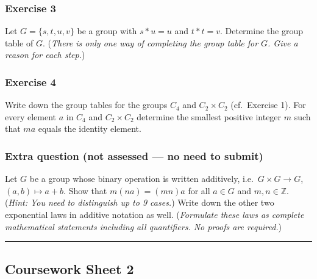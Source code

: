 \documentclass[
  12pt,
  a4paper,
  twoside]{article}
\theoremstyle{plain}
\theoremstyle{definition}
\begin{document}
\hypertarget{exercise-3-1}{%
\subsubsection*{Exercise 3}\label{exercise-3-1}}

Let \(G=\{s,t,u,v\}\) be a group with \(s\ast u = u\) and \(t\ast t = v\). Determine the group table of \(G\). (\emph{There is only one way of completing
the group table for \(G\). Give a reason for each step.})

\hypertarget{exercise-4}{%
\subsubsection*{Exercise 4}\label{exercise-4}}

Write down the group tables for the groups \(C_4\) and \(C_2 \times C_2\) (cf.~Exercise 1). For every element \(a\) in \(C_4\)
and \(C_2 \times C_2\) determine the smallest positive integer
\(m\) such that \(ma\) equals the identity element.

\hypertarget{extra-question-not-assessed-no-need-to-submit}{%
\subsubsection*{Extra question (not assessed --- no need to submit)}\label{extra-question-not-assessed-no-need-to-submit}}

Let \(G\) be a group whose binary operation is written additively,
i.e.~\(G \times G \to G\), \((a,b) \mapsto a+b\). Show that \(m(n a) = (m n) a\) for all \(a \in G\) and \(m,n \in \mathbb{Z}\). (\emph{Hint: You need to
distinguish up to 9 cases.}) Write down the other two
exponential laws in additive notation as well. (\emph{Formulate
these laws as complete mathematical statements including all
quantifiers. No proofs are required.})

\begin{center}\rule{0.5\linewidth}{0.5pt}\end{center}

\hypertarget{coursework-sheet-2}{%
\subsection{Coursework Sheet 2}\label{coursework-sheet-2}}
\end{document}
